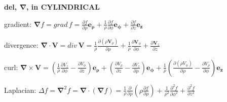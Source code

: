 \documentclass[letterpaper,landscape,10pt]{article}
\newenvironment{mydescription}
{\begin{description}
	\setlength{\itemsep}{0pt}
	\setlength{\parskip}{0pt}
	\setlength{\parsep}{-1pt}}
{\end{description}}
\begin{document}
{\begin{multicols}{3}
		\begin{center}\textbf{del, $\bm{\nabla}$, in CYLINDRICAL}\end{center}
		\begin{mydescription}
			\item[gradient:]
				$\bm{\nabla}f =
				grad\,f =
				\frac{\partial f}{\partial\rho}\bm{e_\rho} +
				\frac{1}{\rho}\frac{\partial f}{\partial\phi}\bm{e_\phi} +
				\frac{\partial f}{\partial z}\bm{e_z}$
			\item[divergence:]
				$\bm{\nabla}\cdot\bm{V} =
				div\, \bm{V} =
				\frac{1}{\rho}\frac{\partial(\rho\bm{V}_\rho)}{\partial\rho} +
				\frac{1}{\rho}\frac{\partial \bm{V}_\phi}{\partial\phi} +
				\frac{\partial \bm{V}_z}{\partial z}
				$
			\item[curl:]
				$\bm{\nabla}\times \bm{V} =
				\left({ \frac{1}{\rho}\frac{\partial V_z}{\partial\phi} -
					\frac{\partial V_\phi}{\partial z}}\right)\bm{e_\rho}+
				\left({ \frac{\partial V_\rho}{\partial z} -
					\frac{\partial  V_z}{\partial\rho}}\right)\bm{e_\phi}+
				\frac{1}{\rho}\left({
					\frac{\partial(\rho V_\phi)}{\partial\rho} -
					\frac{\partial V_\rho}{\partial\phi}}\right)\bm{e_z}
				$
			\item[Laplacian:]
				$\Delta f = \bm{\nabla}^2f =
				\bm{\nabla} \cdot (\bm{\nabla}f) =
				\frac{1}{\rho}\frac{\partial}{\partial\rho}\left({
				\rho\frac{\partial f}{\partial\rho}}\right) +
				\frac{1}{\rho^2}\frac{\partial^2 f}{\partial\phi^2} +
				\frac{\partial^2 f}{\partial z^2}
				$
		\end{mydescription}
		

\end{multicols}}
\end{document}
